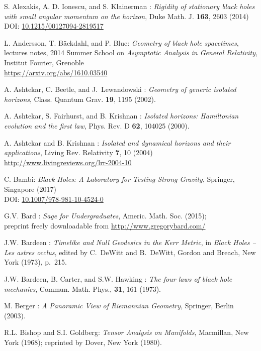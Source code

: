 \begin{thebibliography}{123}

S. Alexakis, A. D. Ionescu, and S. Klainerman : {\em Rigidity of stationary black holes with small angular momentum on the horizon},
Duke Math. J. {\bf 163}, 2603 (2014)\\
DOI: \href{http://dx.doi.org/10.1215/00127094-2819517}{10.1215/00127094-2819517}

L. Andersson, T. Bäckdahl, and P. Blue:
{\em Geometry of black hole spacetimes},
lectures notes,
2014 Summer School on {\em Asymptotic Analysis in General Relativity},
Institut Fourier, Grenoble\\
\url{https://arxiv.org/abs/1610.03540}

A. Ashtekar, C. Beetle, and J.~Lewandowski : {\em Geometry of
generic isolated horizons},
Class. Quantum Grav. {\bf 19}, 1195 (2002).

A. Ashtekar, S. Fairhurst, and B. Krishnan : {\em Isolated horizons:
Hamiltonian evolution and the first law},
Phys. Rev. D {\bf 62}, 104025 (2000).

A. Ashtekar and B. Krishnan : {\em Isolated and dynamical horizons
and their applications},
Living Rev. Relativity {\bf 7}, 10 (2004) \\
\url{http://www.livingreviews.org/lrr-2004-10}

C. Bambi: {\em Black Holes: A Laboratory for Testing Strong Gravity},
Springer, Singapore (2017)\\
DOI: \href{https://doi.org/10.1007/978-981-10-4524-0}{10.1007/978-981-10-4524-0}

G.V. Bard : {\em Sage for Undergraduates}, Americ. Math. Soc. (2015); \\
preprint freely downloadable from \url{http://www.gregorybard.com/}

J.W. Bardeen : {\em Timelike and Null Geodesics in the Kerr Metric},
in {\em Black Holes -- Les astres occlus},  edited by C.~DeWitt and B.~DeWitt,
Gordon and Breach, New York (1973), p.~215.

J.W. Bardeen, B. Carter, and S.W. Hawking : {\em The four laws of black
hole mechanics}, Commun. Math. Phys., {\bf 31}, 161 (1973).

M. Berger : {\em A Panoramic View of Riemannian Geometry},
Springer, Berlin (2003).

R.L. Bishop and S.I. Goldberg:
{\em Tensor Analysis on Manifolds},
Macmillan, New York (1968); reprinted by Dover, New York (1980).


\end{thebibliography}

